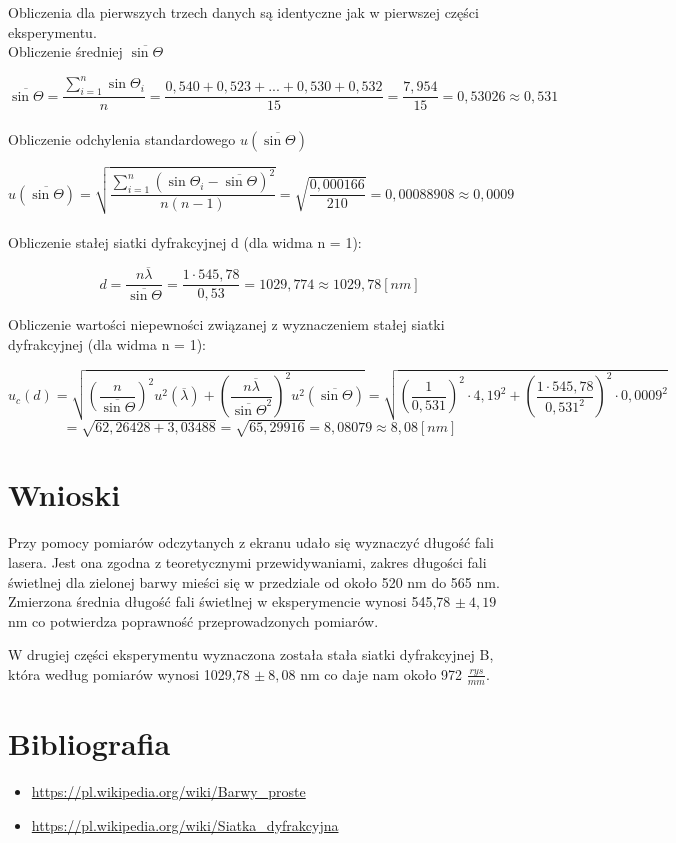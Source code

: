 \documentclass[12pt]{article}
\begin{document}
Obliczenia dla pierwszych trzech danych są identyczne jak w pierwszej części eksperymentu. \\

Obliczenie średniej $ \overline{\sin \Theta}$

$$ \overline{\sin \Theta} = \frac{\sum\limits_{i = 1}^{n} \sin \Theta_i}{n} = 
\frac{0,540 + 0,523 + ... + 0,530 + 0,532}{15} = \frac{7,954}{15} = 0,53026 \approx 0,531 $$ \\

Obliczenie odchylenia standardowego $u(\overline{\sin \Theta})$

$$ u(\overline{\sin \Theta}) = \sqrt{ \frac{\sum\limits_{i = 1}^{n} \left(\sin \Theta_i - \overline{\sin \Theta} \right)^2}{n(n-1)} } 
= \sqrt{ \frac{0,000166}{210} } = 0,00088908 \approx 0,0009 $$ \\

Obliczenie stałej siatki dyfrakcyjnej d (dla widma n = 1):

$$ d = \frac{n \overline{\lambda}}{\overline{\sin \Theta}} = \frac{1 \cdot 545,78}{0,53} = 1029,774 \approx 1029,78[nm] $$

Obliczenie wartości niepewności związanej z wyznaczeniem stałej siatki dyfrakcyjnej \linebreak (dla widma n = 1):

$$ u_c(d) = \sqrt{ \left( \frac{n}{\overline{\sin \Theta}} \right)^2 u^2(\overline{\lambda}) +
\left( \frac{n \overline{\lambda}}{\overline{\sin \Theta}^2} \right)^2 u^2(\overline{\sin \Theta}) } = 
\sqrt{ \left( \frac{1}{0,531} \right)^2 \cdot 4,19^2 + \left( \frac{1 \cdot 545,78}{0,531^2} \right)^2 \cdot 0,0009^2 } $$
$$ = \sqrt{62,26428 + 3,03488} = \sqrt{65,29916} = 8,08079 \approx 8,08[nm] $$

\section{Wnioski}

Przy pomocy pomiarów odczytanych z ekranu udało się wyznaczyć długość fali lasera. Jest ona zgodna
z teoretycznymi przewidywaniami, zakres długości fali świetlnej dla zielonej barwy mieści się w przedziale
od około 520 nm do 565 nm. Zmierzona średnia długość fali świetlnej w eksperymencie wynosi 545,78
$ \pm \ 4,19 $ nm co 
potwierdza poprawność przeprowadzonych pomiarów.

W drugiej części eksperymentu wyznaczona została stała siatki dyfrakcyjnej B, która według pomiarów 
wynosi 1029,78 $ \pm \ 8,08 $ nm co daje nam około 972 $ \frac{rys}{mm}. $

\section{Bibliografia}
\begin{itemize}
    \item \url{https://pl.wikipedia.org/wiki/Barwy_proste}
    \item \url{https://pl.wikipedia.org/wiki/Siatka_dyfrakcyjna}
\end{itemize}
\end{document}
